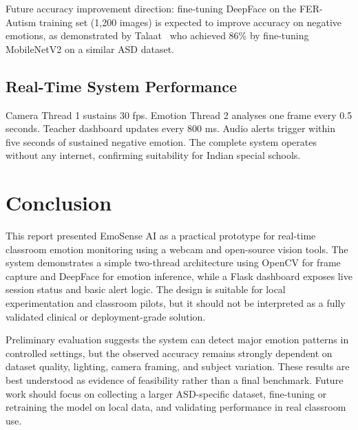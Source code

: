 \documentclass[conference]{IEEEtran}
\begin{document}
Future accuracy improvement direction: fine-tuning
DeepFace on the FER-Autism training set (1,200 images)
is expected to improve accuracy on negative emotions,
as demonstrated by Talaat~\cite{talaat2025} who achieved
86\% by fine-tuning MobileNetV2 on a similar ASD dataset.

\subsection{Real-Time System Performance}

Camera Thread 1 sustains 30 fps. Emotion Thread 2 analyses
one frame every 0.5 seconds. Teacher dashboard updates every
800 ms. Audio alerts trigger within five seconds of sustained
negative emotion. The complete system operates without any
internet, confirming suitability for Indian special schools.

\section{Conclusion}

This report presented EmoSense AI as a practical prototype for
real-time classroom emotion monitoring using a webcam and
open-source vision tools. The system demonstrates a simple
two-thread architecture using OpenCV for frame capture and
DeepFace for emotion inference, while a Flask dashboard exposes
live session status and basic alert logic. The design is
suitable for local experimentation and classroom pilots, but
it should not be interpreted as a fully validated clinical or
deployment-grade solution.

Preliminary evaluation suggests the system can detect major
emotion patterns in controlled settings, but the observed
accuracy remains strongly dependent on dataset quality,
lighting, camera framing, and subject variation. These results
are best understood as evidence of feasibility rather than a
final benchmark. Future work should focus on collecting a larger
ASD-specific dataset, fine-tuning or retraining the model on
local data, and validating performance in real classroom use.
\end{document}
